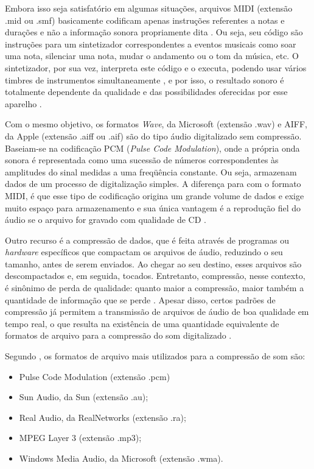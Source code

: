 Embora isso seja satisfatório em algumas situações, arquivos MIDI (extensão .mid ou .smf) basicamente codificam apenas instruções referentes a notas e durações e não a informação sonora propriamente dita \cite{fernando&kon1998}. Ou seja, seu código são instruções para um sintetizador correspondentes a eventos musicais como soar uma nota, silenciar uma nota, mudar o andamento ou o tom da música, etc. O sintetizador, por sua vez, interpreta este código e o executa, podendo usar vários timbres de instrumentos simultaneamente \cite{miletto2004}, e por isso, o resultado sonoro é totalmente dependente da qualidade e das possibilidades oferecidas por esse aparelho \cite{fernando&kon1998}.

Com o mesmo objetivo, os formatos \textit{Wave}, da Microsoft (extensão .wav) e AIFF, da Apple (extensão .aiff ou .aif) são do tipo áudio digitalizado sem compressão. Baseiam-se na codificação PCM (\textit{Pulse Code Modulation}), onde a própria onda sonora é representada como uma sucessão de números correspondentes às amplitudes do sinal medidas a uma freqüência constante. Ou seja, armazenam dados de um processo de digitalização simples. A diferença para com o formato MIDI, é que esse tipo de codificação origina um grande volume de dados e exige muito espaço para armazenamento e sua única vantagem é a reprodução fiel do áudio se o arquivo for gravado com qualidade de CD \cite{miletto2004}.

Outro recurso é a compressão de dados, que é feita através de programas ou \textit{hardware} específicos que compactam os arquivos de áudio, reduzindo o seu tamanho, antes de serem enviados. Ao chegar ao seu destino, esses arquivos são descompactados e, em seguida, tocados. Entretanto, compressão, nesse contexto, é sinônimo de perda de qualidade: quanto maior a compressão, maior também a quantidade de informação que se perde \cite{fernando&kon1998}. Apesar disso, certos padrões de compressão já permitem a transmissão de arquivos de áudio de boa qualidade em tempo real, o que resulta na existência de uma quantidade equivalente de formatos de arquivo para a compressão do som digitalizado \cite{miletto2004}.

Segundo , os formatos de arquivo mais utilizados para a compressão de som são:

\begin{itemize}
   \item Pulse Code Modulation (extensão .pcm)
   \item Sun Audio, da Sun (extensão .au);
   \item Real Audio, da RealNetworks (extensão .ra);
   \item MPEG Layer 3 (extensão .mp3);
   \item Windows Media Audio, da Microsoft (extensão .wma).
 \end{itemize}
 

